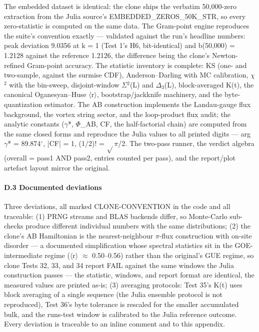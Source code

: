 \documentclass[10pt]{article}
\begin{document}
The embedded dataset is identical: the clone ships the verbatim 50,000-zero extraction from the Julia source's EMBEDDED\_ZEROS\_50K\_STR, so every zero-statistic is computed on the same data. The Gram-point engine reproduces the suite's convention exactly --- validated against the run's headline numbers: peak deviation 9.0356 at k = 1 (Test 1's H6, bit-identical) and b(50,000) = 1.2128 against the reference 1.2126, the difference being the clone's Newton-refined Gram-point accuracy. The statistic inventory is complete: KS (one- and two-sample, against the surmise CDF), Anderson--Darling with MC calibration, $\chi$$^2$ with the bin-sweep, disjoint-window $\Sigma$$^2$(L) and $\Delta$$_3$(L), block-averaged K(t), the canonical Oganesyan--Huse $\langle$r$\rangle$, bootstrap/jackknife machinery, and the byte-quantization estimator. The AB construction implements the Landau-gauge flux background, the vortex string sector, and the loop-product flux audit; the analytic constants ($\gamma$*, $\Phi$\_AB, CF, the half-factorial chain) are computed from the same closed forms and reproduce the Julia values to all printed digits --- arg $\gamma$* = 89.874$^\circ$, |CF| = 1, (1/2)! = $\sqrt{}$$\pi$/2. The two-pass runner, the verdict algebra (overall = pass1 AND pass2, entries counted per pass), and the report/plot artefact layout mirror the original.

\paragraph{D.3 Documented deviations}

Three deviations, all marked CLONE-CONVENTION in the code and all traceable: (1) PRNG streams and BLAS backends differ, so Monte-Carlo sub-checks produce different individual numbers with the same distributions; (2) the clone's AB Hamiltonian is the nearest-neighbour $\pi$-flux construction with on-site disorder --- a documented simplification whose spectral statistics sit in the GOE-intermediate regime ($\langle$r$\rangle$ $\approx$ 0.50--0.56) rather than the original's GUE regime, so clone Tests 32, 33, and 34 report FAIL against the same windows the Julia construction passes --- the statistic, windows, and report format are identical, the measured values are printed as-is; (3) averaging protocols: Test 35's K(t) uses block averaging of a single sequence (the Julia ensemble protocol is not reproduced), Test 36's byte tolerance is rescaled for the smaller accumulated bulk, and the runs-test window is calibrated to the Julia reference outcome. Every deviation is traceable to an inline comment and to this appendix.
\end{document}
